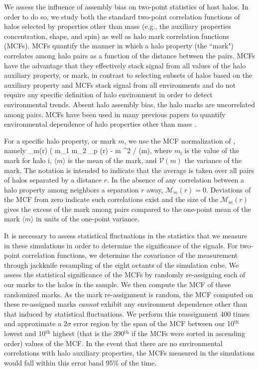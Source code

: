 \documentclass[usenatbib]{mnras}
\begin{document}
We assess the influence of assembly bias on two-point statistics of host halos. In order to do so, we 
study both the standard two-point correlation functions of halos selected by properties other than mass 
(e.g., the auxiliary properties concentration, shape, and spin) as well as halo mark correlation functions
(MCFs). MCFs quantify the manner in which a halo property (the ``mark") correlates among halo pairs as a function
of the distance between the pairs. MCFs have the advantage that they effectively stack signal from all values of 
the halo auxiliary property, or mark, in contrast to selecting subsets of halos based on the auxiliary property and 
MCFs stack signal from all environments and do not require any specific definition of halo environment in order 
to detect environmental trends. Absent halo assembly bias, the halo marks are uncorrelated among pairs. 
MCFs have been used in many previous papers to quantify environmental dependence of halo 
properties other than mass \citep{sheth_tormen04,sheth05, harker_etal06,wechsler_etal06,mao_etal15} . 


For a specific halo property, or mark $m$, we use the MCF normalization of \citet{wechsler_etal06}, namely 
%
\beq
{}_m(r) \equiv ( \langle m_1 m_2 \rangle_p (r) - \langle m \rangle^2 / (m),
\eeq
%
where $m_{\mathrm{i}}$ is the value of the mark for halo $\mathrm{i}$, $\langle m \rangle$ is the mean of the
mark, and $\mathcal{V}(m)$ the variance of the mark. The notation is intended to indicate that the average is
taken over all pairs of halos separated by a distance $r$. In the absence of any correlation between a halo
property among neighbors a separation $r$ away, $\mathcal{M}_m(r) = 0$. Deviations of the MCF from
zero indicate such correlations exist and the size of the $\mathcal{M}_m(r)$ gives the excess of the mark among
pairs compared to the one-point mean of the mark $\langle m\rangle$ in units of the one-point variance. 


It is necessary to assess statistical fluctuations in the statistics that we measure in these simulations in
order to determine the significance of the signals. For two-point correlation functions, we determine the
covariance of the measurement through jackknife resampling of the eight octants of the simulation cube. We assess
the statistical significance of the MCFs by randomly re-assigning each of our marks to the halos in the sample. 
We then compute the MCF of these randomized marks. As the mark re-assignment is random, 
the MCF computed on these re-assigned marks {\em cannot} exhibit any 
environment dependence other than that induced by statistical fluctuations. 
We perform this reassignment 400 times and approximate a $2\sigma$ error region by 
the span of the MCF between our 10$^\mathrm{th}$ lowest and 10$^\mathrm{th}$ highest (that is the
390$^\mathrm{th}$ if the MCFs were sorted in ascending order) values of the MCF. In the event that there are no
environmental correlations with halo auxiliary properties, the MCFs measured in the simulations would fall within
this error band $95\%$ of the time. 
\end{document}

